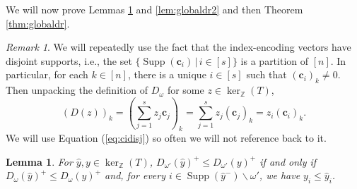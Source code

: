 \documentclass[a4paper, 12pt]{article}
\newcommand{\ZZ}{\mathbb Z}
\theoremstyle{plain}
\newtheorem{lemma}[theorem]{Lemma}
\theoremstyle{definition}
\theoremstyle{remark}
\newtheorem{remark}[theorem]{Remark}
\begin{document}
We will now prove Lemmas \ref{lem:globaldr1} and \ref{lem:globaldr2} and then Theorem \ref{thm:globaldr}.


\begin{remark}
    We will repeatedly use the fact that the index-encoding vectors have disjoint supports, i.e., the set $\{\operatorname{Supp}(\mathbf{c}_i) \,|\, i \in [s]\}$ is a partition of $[n]$. In particular, for each $k \in [n]$, there is a unique $i \in [s]$ such that $(\mathbf{c}_i)_k \neq 0$. Then unpacking the definition of $D_{\omega}$ for some $z \in \ker_\ZZ(T)$, 
\begin{equation} \label{eq:cidisj}
    (D(z))_k=\left(\sum_{j=1}^s z_j \mathbf{c}_j \right)_k=\sum_{j=1}^s z_j (\mathbf{c}_j)_k=z_i (\mathbf{c}_i)_k.
\end{equation}
We will use Equation (\ref{eq:cidisj}) so often we will not reference back to it.
\end{remark}


\begin{lemma} \label{lem:globaldr1}
    For $\hat y,y \in \ker_\ZZ(T)$, $D_{\omega'}(\hat y)^+ \le D_{\omega'}(y)^+$ if and only if $D_{\omega}(\hat y)^+ \le D_{\omega}(y)^+$ and, for every $i \in \operatorname{Supp}(\hat y^-) \backslash \omega'$, we have $y_i \le \hat y_i$.
\end{lemma}
\end{document}
